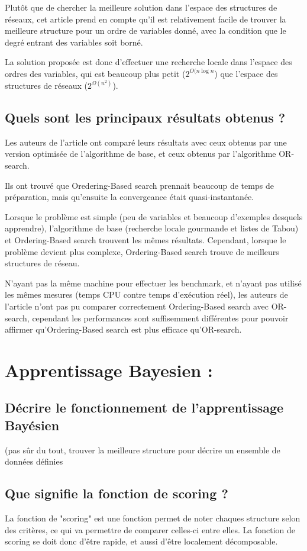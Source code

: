 \documentclass[french,a4paper]{article}
\begin{document}
Plutôt que de chercher la meilleure solution dans l'espace des
structures de réseaux, cet article prend en compte qu'il est
relativement facile de trouver la meilleure structure pour un ordre de
variables donné, avec la condition que le degré entrant des variables
soit borné.

La solution proposée est donc d'effectuer une recherche locale dans
l'espace des ordres des variables, qui est beaucoup plus petit
($2^{O(n \log n}$) que l'espace des structures de réseaux ($2^{\Omega(n^2)}$).

\subsection{Quels sont les principaux résultats obtenus ?}

Les auteurs de l'article ont comparé leurs résultats avec ceux obtenus
par une version optimisée de l'algorithme de base, et ceux obtenus par
l'algorithme OR-search.

Ils ont trouvé que Oredering-Based search prennait beaucoup de temps
de préparation, mais qu'ensuite la convergeance était
quasi-instantanée.

Lorsque le problème est simple (peu de variables et beaucoup
d'exemples desquels apprendre), l'algorithme de base (recherche locale
gourmande et listes de Tabou) et Ordering-Based search trouvent les
mêmes résultats. Cependant, lorsque le problème devient plus complexe,
Ordering-Based search trouve de meilleurs structures de réseau.

N'ayant pas la même machine pour effectuer les benchmark, et n'ayant
pas utilisé les mêmes mesures (temps CPU contre temps d'exécution
réel), les auteurs de l'article n'ont pas pu comparer correctement
Ordering-Based search avec OR-search, cependant les performances sont
suffisemment différentes pour pouvoir affirmer qu'Ordering-Based
search est plus efficace qu'OR-search.

\section{Apprentissage Bayesien :}
\subsection{Décrire le fonctionnement de l'apprentissage Bayésien}
(pas sûr du tout, trouver la meilleure structure pour décrire un ensemble de données définies

\subsection{Que signifie la fonction de scoring ?}
La fonction de "scoring" est une fonction permet de noter chaques structure selon des critères, ce qui va permettre de comparer celles-ci entre elles.
La fonction de scoring se doit donc d'être rapide, et aussi d'être localement décomposable.
\end{document}
